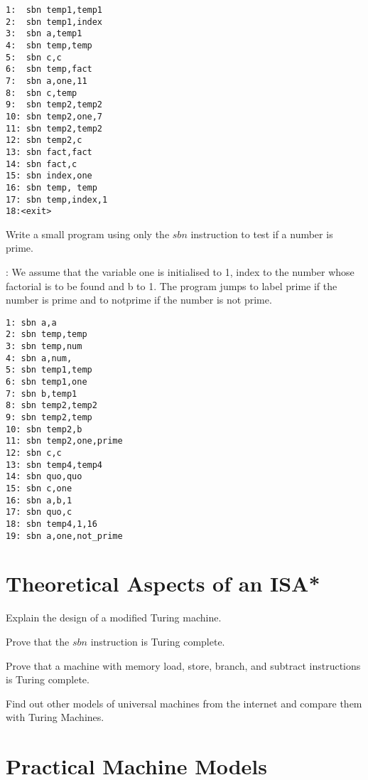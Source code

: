 \begin{ExerciseList}
\begin{Verbatim}[frame=single]
1:  sbn temp1,temp1
2:  sbn temp1,index
3:  sbn a,temp1
4:  sbn temp,temp
5:  sbn c,c
6:  sbn temp,fact
7:  sbn a,one,11
8:  sbn c,temp
9:  sbn temp2,temp2
10: sbn temp2,one,7 
11: sbn temp2,temp2
12: sbn temp2,c
13: sbn fact,fact
14: sbn fact,c
15: sbn index,one
16: sbn temp, temp
17: sbn temp,index,1
18:<exit>
\end{Verbatim}
\Exercise[difficulty=1]
Write a small program using only the $sbn$ instruction to test if a number is prime. 

\Answer:
We assume that the variable one is initialised to 1, index to the number whose factorial is to be found and b to 1.
The program jumps to label prime if the number is prime and to notprime if the number is not prime.

\begin{Verbatim}[frame=single]
1: sbn a,a
2: sbn temp,temp
3: sbn temp,num
4: sbn a,num,
5: sbn temp1,temp
6: sbn temp1,one
7: sbn b,temp1
8: sbn temp2,temp2
9: sbn temp2,temp
10: sbn temp2,b
11: sbn temp2,one,prime
12: sbn c,c
13: sbn temp4,temp4
14: sbn quo,quo
15: sbn c,one
16: sbn a,b,1
17: sbn quo,c
18: sbn temp4,1,16
19: sbn a,one,not_prime
\end{Verbatim}

\end{ExerciseList}

\section*{Theoretical Aspects of an ISA*}
\begin{ExerciseList}

\Exercise
Explain the design of a modified Turing machine.

\Exercise
Prove that the $sbn$ instruction is Turing complete.

\Exercise
Prove that a machine with memory load, store, branch, and subtract instructions is Turing complete.

\Exercise[difficulty=2]
Find out other models of universal machines from the internet and compare them with
Turing Machines. 
\end{ExerciseList}

\section*{Practical Machine Models}


